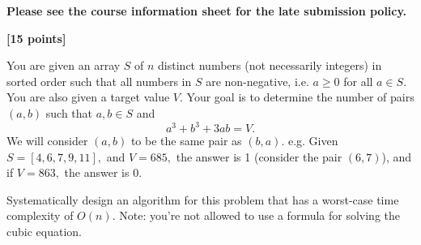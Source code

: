 \documentclass{assignment-373}
\begin{document}
\think

\textbf{Please see the course information sheet for the late submission
  policy.}

\textbf{[15 points]}

You are given an array $S$ of $n$ distinct numbers (not necessarily
integers) in sorted order such that all numbers in $S$ are
non-negative, i.e.  $a \ge 0$ for all $a \in S.$ You are also given a
target value $V.$ Your goal is to determine the number of pairs
$(a, b)$ such that $a, b \in S$ and
\[a^3 + b^3 + 3ab = V.\]
We will consider $(a, b)$ to be the same pair
as $(b, a).$ e.g.
Given $S = [4, 6, 7, 9, 11],$ and $V = 685,$ the answer is 1
(consider the pair $(6, 7)$), and if $V = 863,$ the answer is 0.

Systematically design an algorithm for this problem that has a
worst-case time complexity of $O(n).$  Note: you're not allowed to use
a formula for solving the cubic equation.
\end{document}
